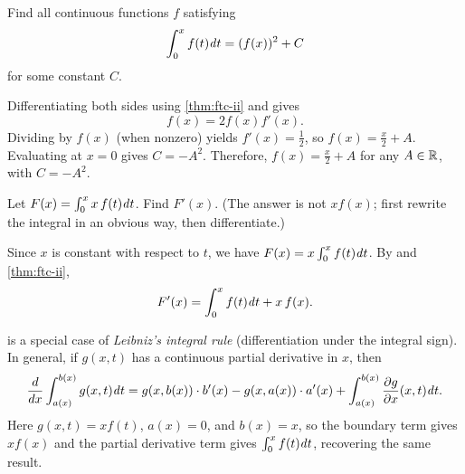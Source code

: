 \begin{problem}
  Find all continuous functions $f$ satisfying
  \[
    \int_{0}^{x} f(t) \mathit{d} t = (f(x))^{2} + C
  \]
  for some constant $C$.
  \vspace{\baselineskip}

  Differentiating both sides using \ref{thm:ftc-ii} and
   gives
  \[
    f(x) = 2f(x)f'(x).
  \]
  Dividing by $f(x)$ (when nonzero) yields $f'(x) = \frac{1}{2}$,
  so $f(x) = \frac{x}{2} + A$. Evaluating at $x = 0$ gives $C = -A^{2}$.
  Therefore, $f(x) = \frac{x}{2} + A$ for any $A \in \mathbb{R}$, with $C = -A^{2}$.
\end{problem}

\begin{problem}
  \label{prob:leibniz-integral-rule}
  Let $F(x) = \int_{0}^{x} x \, f(t) \mathit{d} t$. Find $F'(x)$. (The answer is not $x f(x)$;
  first rewrite the integral in an obvious way, then differentiate.)
  \vspace{\baselineskip}

  Since $x$ is constant with respect to $t$, we have
  $F(x) = x \int_{0}^{x} f(t) \mathit{d} t$. By 
  and \ref{thm:ftc-ii},
  \[
    F'(x) = \int_{0}^{x} f(t) \mathit{d} t + x \, f(x).
  \]
  \begin{callout}
     is a special case of \textit{Leibniz's integral rule}
    (differentiation under the integral sign). In general, if
    $g(x, t)$ has a continuous partial derivative in $x$, then
    \[
      \frac{d}{dx} \int_{a(x)}^{b(x)} g(x, t) \mathit{d} t
      = g(x, b(x)) \cdot b'(x) - g(x, a(x)) \cdot a'(x)
        + \int_{a(x)}^{b(x)} \frac{\partial g}{\partial x}(x, t) \mathit{d} t.
    \]
    Here $g(x, t) = x f(t)$, $a(x) = 0$, and $b(x) = x$, so the
    boundary term gives $x f(x)$ and the partial derivative term gives
    $\int_{0}^{x} f(t) \mathit{d} t$, recovering the same result.
  \end{callout}
\end{problem}

